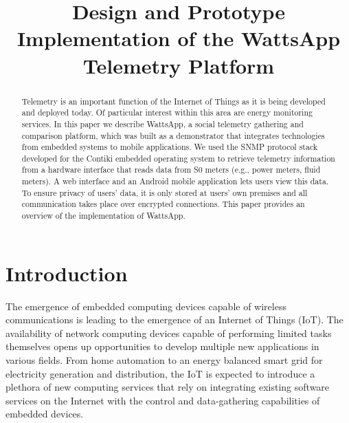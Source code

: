 \documentclass[10pt, conference, compsocconf]{IEEEtran}
\begin{document}
\title{Design and Prototype Implementation of the WattsApp Telemetry Platform}
\author{
}

\maketitle

\begin{abstract}
Telemetry is an important function of the Internet of Things as it
is being developed and deployed today. Of particular interest within
this area are energy monitoring services. In this paper we describe
WattsApp, a social telemetry gathering and comparison platform, which
was built as a demonstrator that integrates technologies from embedded
systems to mobile applications. We used the SNMP protocol stack developed
for the Contiki embedded operating system to retrieve telemetry information
from a hardware interface that reads data from S0 meters (e.g., power
meters, fluid meters). A web interface and an Android mobile application
lets users view this data. To ensure privacy of users' data, it is
only stored at users' own premises and all communication takes place
over encrypted connections. This paper provides an overview of the
implementation of WattsApp. 
\end{abstract}

\section{Introduction}

The emergence of embedded computing devices capable of wireless communications
is leading to the emergence of an Internet of Things (IoT). The availability
of network computing devices capable of performing limited tasks themselves
opens up opportunities to develop multiple new applications in various
fields. From home automation to an energy balanced smart grid for
electricity generation and distribution, the IoT is expected to introduce
a plethora of new computing services that rely on integrating existing
software services on the Internet with the control and data-gathering
capabilities of embedded devices.
\end{document}
